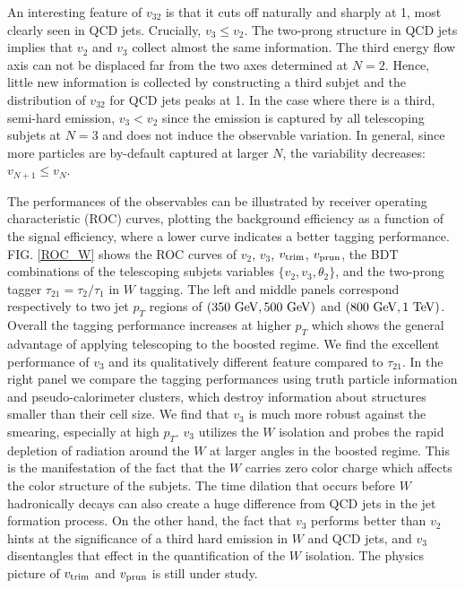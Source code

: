 \documentclass[aps,prl,floatfix,preprintnumbers,twocolumn,groupedaddress,nofootinbib]{revtex4-1}
\begin{document}
An interesting feature of $v_{32}$ is that it cuts off naturally and sharply at 1, most clearly seen in QCD jets. Crucially, $v_{3} \leq v_{2}$. The two-prong structure in QCD jets implies that $v_{2}$ and $v_{3}$ collect almost the same information. The third energy flow axis can not be displaced far from the two axes determined at $N=2$. Hence, little new information is collected by constructing a third subjet and the distribution of $v_{32}$ for QCD jets peaks at 1. In the case where there is a third, semi-hard emission, $v_{3} < v_{2}$ since the emission is captured by all telescoping subjets at $N=3$ and does not induce the observable variation. In general, since more particles are by-default captured at larger $N$, the variability decreases: $v_{N+1}\leq v_{N}$.

The performances of the observables can be illustrated by receiver operating characteristic (ROC) curves, plotting the background efficiency as a function of the signal efficiency, where a lower curve indicates a better tagging performance. FIG. \ref{ROC_W} shows the ROC curves of $v_2$, $v_3$, $v_{\rm trim}$, $v_{\rm prun}$, the BDT combinations of the telescoping subjets variables $\{v_2, v_3, \theta_2\}$, and the two-prong tagger $\tau_{21}=\tau_{2}/\tau_{1}$ in $W$ tagging. The left and middle panels correspond respectively to two jet $p_T$ regions of $(350~{\rm GeV}, 500~{\rm GeV})$ and $(800~{\rm GeV}, 1~{\rm TeV})$. Overall the tagging performance increases at higher $p_T$ which shows the general advantage of applying telescoping to the boosted regime. We find the excellent performance of $v_3$ and its qualitatively different feature compared to $\tau_{21}$. In the right panel we compare the tagging performances using truth particle information and pseudo-calorimeter clusters, which destroy information about structures smaller than their cell size. We find that $v_3$ is much more robust against the smearing, especially at high $p_T$. $v_3$ utilizes the $W$ isolation and probes the rapid depletion of radiation around the $W$ at larger angles in the boosted regime. This is the manifestation of the fact that the $W$ carries zero color charge which affects the color structure of the subjets. The time dilation that occurs before $W$ hadronically decays can also create a huge difference from QCD jets in the jet formation process. On the other hand, the fact that $v_3$ performs better than $v_2$ hints at the significance of a third hard emission in $W$ and QCD jets, and $v_3$ disentangles that effect in the quantification of the $W$ isolation. The physics picture of $v_{\rm trim}$ and $v_{\rm prun}$ is still under study.
\end{document}
